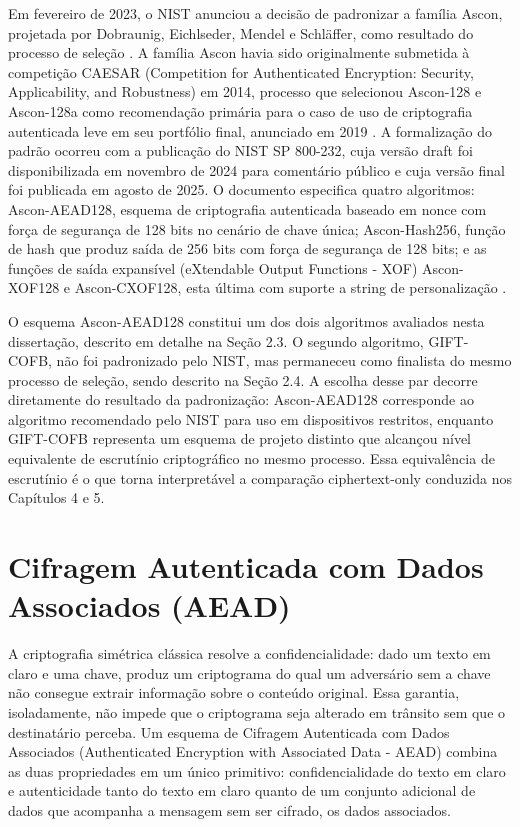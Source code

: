 Em fevereiro de 2023, o NIST anunciou a decisão de padronizar a família Ascon, projetada por Dobraunig, Eichlseder, Mendel e Schläffer, como resultado do processo de seleção \cite{Turan2023NISTLWCFinal}. A família Ascon havia sido originalmente submetida à competição CAESAR (Competition for Authenticated Encryption: Security, Applicability, and Robustness) em 2014, processo que selecionou Ascon-128 e Ascon-128a como recomendação primária para o caso de uso de criptografia autenticada leve em seu portfólio final, anunciado em 2019 \cite{cesar}. A formalização do padrão ocorreu com a publicação do NIST SP 800-232, cuja versão draft foi disponibilizada em novembro de 2024 para comentário público e cuja versão final foi publicada em agosto de 2025. O documento especifica quatro algoritmos: Ascon-AEAD128, esquema de criptografia autenticada baseado em nonce com força de segurança de 128 bits no cenário de chave única; Ascon-Hash256, função de hash que produz saída de 256 bits com força de segurança de 128 bits; e as funções de saída expansível (eXtendable Output Functions - XOF) Ascon-XOF128 e Ascon-CXOF128, esta última com suporte a string de personalização \cite{nist_sp800232_2025}.

O esquema Ascon-AEAD128 constitui um dos dois algoritmos avaliados nesta dissertação, descrito em detalhe na Seção 2.3. O segundo algoritmo, GIFT-COFB, não foi padronizado pelo NIST, mas permaneceu como finalista do mesmo processo de seleção, sendo descrito na Seção 2.4. A escolha desse par decorre diretamente do resultado da padronização: Ascon-AEAD128 corresponde ao algoritmo recomendado pelo NIST para uso em dispositivos restritos, enquanto GIFT-COFB representa um esquema de projeto distinto que alcançou nível equivalente de escrutínio criptográfico no mesmo processo. Essa equivalência de escrutínio é o que torna interpretável a comparação ciphertext-only conduzida nos Capítulos 4 e 5.



\section{Cifragem Autenticada com Dados Associados (AEAD)}

A criptografia simétrica clássica resolve a confidencialidade: dado um texto em claro e uma chave, produz um criptograma do qual um adversário sem a chave não consegue extrair informação sobre o conteúdo original. Essa garantia, isoladamente, não impede que o criptograma seja alterado em trânsito sem que o destinatário perceba. Um esquema de Cifragem Autenticada com Dados Associados (Authenticated Encryption with Associated Data - AEAD) combina as duas propriedades em um único primitivo: confidencialidade do texto em claro e autenticidade tanto do texto em claro quanto de um conjunto adicional de dados que acompanha a mensagem sem ser cifrado, os dados associados.

